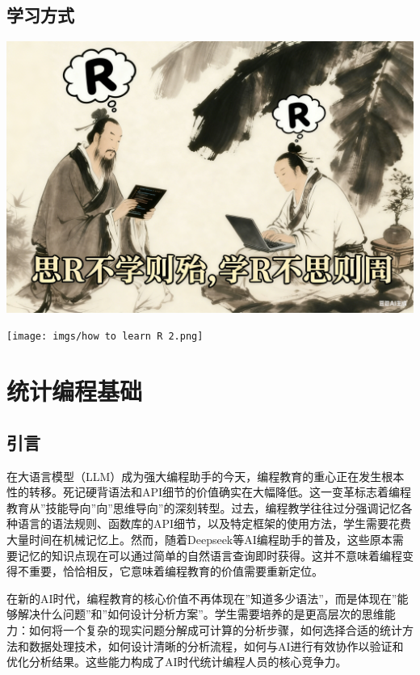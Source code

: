 \documentclass[
]{book}
\begin{document}
\hypertarget{ux5b66ux4e60ux65b9ux5f0f}{%
\section{学习方式}\label{ux5b66ux4e60ux65b9ux5f0f}}

\includegraphics{imgs/how to learn R.png}

\texttt{[image: imgs/how to learn R 2.png]}

\hypertarget{ux7edfux8ba1ux7f16ux7a0bux57faux7840}{%
\chapter{统计编程基础}\label{ux7edfux8ba1ux7f16ux7a0bux57faux7840}}

\hypertarget{ux5f15ux8a00}{%
\section{引言}\label{ux5f15ux8a00}}

在大语言模型（LLM）成为强大编程助手的今天，编程教育的重心正在发生根本性的转移。死记硬背语法和API细节的价值确实在大幅降低。这一变革标志着编程教育从''技能导向''向''思维导向''的深刻转型。过去，编程教学往往过分强调记忆各种语言的语法规则、函数库的API细节，以及特定框架的使用方法，学生需要花费大量时间在机械记忆上。然而，随着Deepseek等AI编程助手的普及，这些原本需要记忆的知识点现在可以通过简单的自然语言查询即时获得。这并不意味着编程变得不重要，恰恰相反，它意味着编程教育的价值需要重新定位。

在新的AI时代，编程教育的核心价值不再体现在''知道多少语法''，而是体现在''能够解决什么问题''和''如何设计分析方案''。学生需要培养的是更高层次的思维能力：如何将一个复杂的现实问题分解成可计算的分析步骤，如何选择合适的统计方法和数据处理技术，如何设计清晰的分析流程，如何与AI进行有效协作以验证和优化分析结果。这些能力构成了AI时代统计编程人员的核心竞争力。
\end{document}
